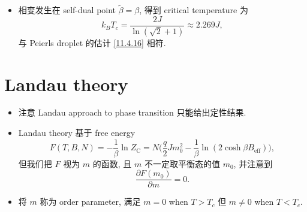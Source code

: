 \begin{itemize}
	\item 相变发生在 self-dual point $\tilde{\beta} = \beta$, 得到 critical temperature 为
	\begin{equation}
		k_B T_c = \frac{2 J}{\ln(\sqrt{2} + 1)} \approx 2.269 J,
	\end{equation}
	与 Peierls droplet 的估计 \eqref{11.4.16} 相符.
\end{itemize}

\section{Landau theory}
\begin{itemize}
	\item 注意 Landau approach to phase transition 只能给出定性结果.
	
	\item Landau theory 基于 free energy
	\begin{equation}
		F(T, B, N) = - \frac{1}{\beta} \ln Z_\text{C} = N \Big( \frac{q}{2} J m_0^2 - \frac{1}{\beta} \ln(2 \cosh \beta B_\text{eff}) \Big),
	\end{equation}
	但我们把 $F$ 视为 $m$ 的函数, 且 $m$ 不一定取平衡态的值 $m_0$, 并注意到
	\begin{equation}
		\frac{\partial F(m_0)}{\partial m} = 0.
	\end{equation}
	
	\item 将 $m$ 称为 order parameter, 满足 $m = 0$ when $T > T_c$ 但 $m \neq 0$ when $T < T_c$.
\end{itemize}

